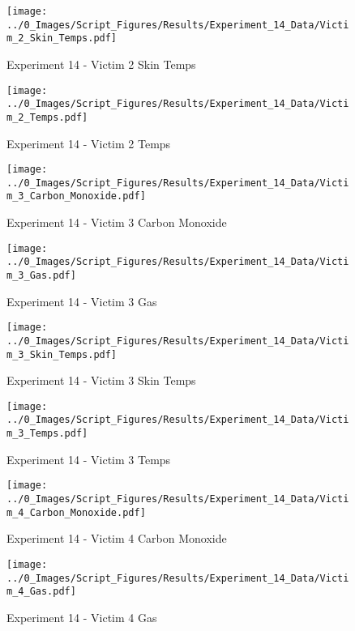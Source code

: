	\begin{figure}[H]
		\centering
		\texttt{[image: ../0\_Images/Script\_Figures/Results/Experiment\_14\_Data/Victim\_2\_Skin\_Temps.pdf]}
		\caption[]{Experiment 14 - Victim 2 Skin Temps}
	\end{figure}
 
	\clearpage

	\begin{figure}[H]
		\centering
		\texttt{[image: ../0\_Images/Script\_Figures/Results/Experiment\_14\_Data/Victim\_2\_Temps.pdf]}
		\caption[]{Experiment 14 - Victim 2 Temps}
	\end{figure}
 

	\begin{figure}[H]
		\centering
		\texttt{[image: ../0\_Images/Script\_Figures/Results/Experiment\_14\_Data/Victim\_3\_Carbon\_Monoxide.pdf]}
		\caption[]{Experiment 14 - Victim 3 Carbon Monoxide}
	\end{figure}
 
	\clearpage

	\begin{figure}[H]
		\centering
		\texttt{[image: ../0\_Images/Script\_Figures/Results/Experiment\_14\_Data/Victim\_3\_Gas.pdf]}
		\caption[]{Experiment 14 - Victim 3 Gas}
	\end{figure}
 

	\begin{figure}[H]
		\centering
		\texttt{[image: ../0\_Images/Script\_Figures/Results/Experiment\_14\_Data/Victim\_3\_Skin\_Temps.pdf]}
		\caption[]{Experiment 14 - Victim 3 Skin Temps}
	\end{figure}
 
	\clearpage

	\begin{figure}[H]
		\centering
		\texttt{[image: ../0\_Images/Script\_Figures/Results/Experiment\_14\_Data/Victim\_3\_Temps.pdf]}
		\caption[]{Experiment 14 - Victim 3 Temps}
	\end{figure}
 

	\begin{figure}[H]
		\centering
		\texttt{[image: ../0\_Images/Script\_Figures/Results/Experiment\_14\_Data/Victim\_4\_Carbon\_Monoxide.pdf]}
		\caption[]{Experiment 14 - Victim 4 Carbon Monoxide}
	\end{figure}
 
	\clearpage

	\begin{figure}[H]
		\centering
		\texttt{[image: ../0\_Images/Script\_Figures/Results/Experiment\_14\_Data/Victim\_4\_Gas.pdf]}
		\caption[]{Experiment 14 - Victim 4 Gas}
	\end{figure}
 


